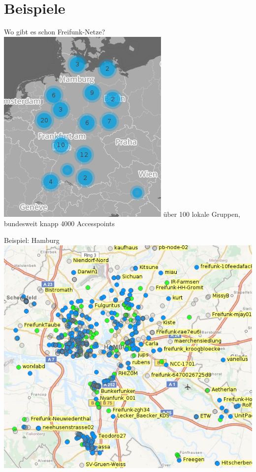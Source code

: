 \documentclass{beamer}
\begin{document}
\section{Beispiele}
\begin{frame}{Wo gibt es schon Freifunk-Netze?}
\vfill
\centering
\includegraphics[scale=0.5]{images/map}
\vfill
über 100 lokale Gruppen, bundesweit knapp 4000 Accesspoints
\vfill
\end{frame}

\begin{frame}{Beispiel: Hamburg}
\vfill
\centering
\includegraphics[scale=0.4]{images/hamburg-map}
\vfill
\end{frame}
\end{document}
